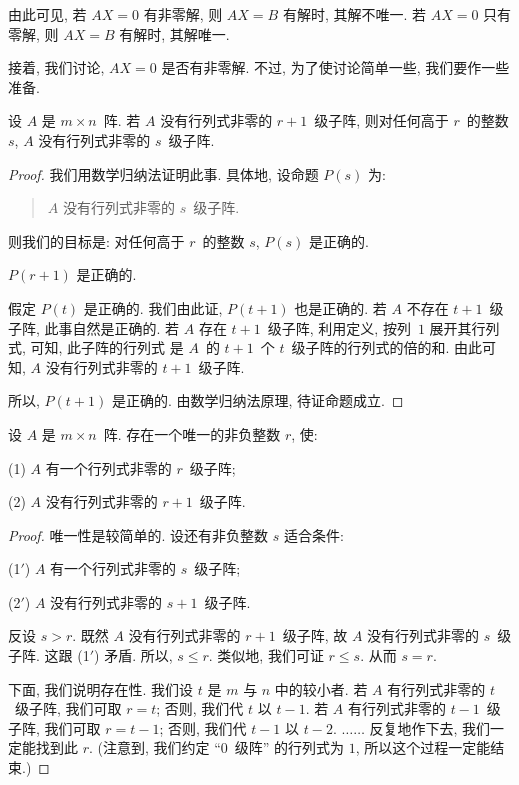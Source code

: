 由此可见, 若 \(AX = 0\) 有非零解,
则 \(AX = B\) 有解时,
其解不唯一.
若 \(AX = 0\) 只有零解,
则 \(AX = B\) 有解时,
其解唯一.

接着, 我们讨论, \(AX = 0\) 是否有非零解.
不过, 为了使讨论简单一些, 我们要作一些准备.

\begin{theorem}
    设 \(A\) 是 \(m \times n\)~阵.
    若 \(A\) 没有行列式非零的 \(r+1\)~级子阵,
    则对任何高于 \(r\)~的整数 \(s\),
    \(A\) 没有行列式非零的 \(s\)~级子阵.
\end{theorem}

\begin{proof}
    我们用数学归纳法证明此事.
    具体地, 设命题 \(P(s)\) 为:
    \begin{quotation}
        \(A\) 没有行列式非零的 \(s\)~级子阵.
    \end{quotation}
    则我们的目标是:
    对任何高于 \(r\)~的整数 \(s\),
    \(P(s)\) 是正确的.

    \(P(r+1)\) 是正确的.

    假定 \(P(t)\) 是正确的.
    我们由此证, \(P(t+1)\) 也是正确的.
    若 \(A\) 不存在 \(t+1\)~级子阵,
    此事自然是正确的.
    若 \(A\) 存在 \(t+1\)~级子阵,
    利用定义, 按列~\(1\) 展开其行列式,
    可知,
    此子阵的行列式%
    是 \(A\)~的 \(t+1\)~个 \(t\)~级子阵的行列式的倍的和.
    由此可知,
    \(A\) 没有行列式非零的 \(t+1\)~级子阵.

    所以, \(P(t+1)\) 是正确的.
    由数学归纳法原理, 待证命题成立.
\end{proof}

\begin{theorem}
    设 \(A\) 是 \(m \times n\)~阵.
    存在一个唯一的非负整数 \(r\),
    使:

    (1)
    \(A\) 有一个行列式非零的 \(r\)~级子阵;

    (2)
    \(A\) 没有行列式非零的 \(r+1\)~级子阵.
\end{theorem}

\begin{proof}
    唯一性是较简单的.
    设还有非负整数 \(s\) 适合条件:

    (1\ensuremath{'})
    \(A\) 有一个行列式非零的 \(s\)~级子阵;

    (2\ensuremath{'})
    \(A\) 没有行列式非零的 \(s+1\)~级子阵.

    反设 \(s > r\).
    既然 \(A\) 没有行列式非零的 \(r+1\)~级子阵,
    故 \(A\) 没有行列式非零的 \(s\)~级子阵.
    这跟 (1\ensuremath{'}) 矛盾.
    所以, \(s \leq r\).
    类似地, 我们可证 \(r \leq s\).
    从而 \(s = r\).

    下面, 我们说明存在性.
    我们设 \(t\) 是 \(m\) 与 \(n\) 中的较小者.
    若 \(A\) 有行列式非零的 \(t\)~级子阵,
    我们可取 \(r = t\);
    否则, 我们代 \(t\) 以 \(t - 1\).
    若 \(A\) 有行列式非零的 \(t - 1\)~级子阵,
    我们可取 \(r = t - 1\);
    否则, 我们代 \(t - 1\) 以 \(t - 2\).
    \(\dots \dots\)
    反复地作下去,
    我们一定能找到此 \(r\).
    (注意到, 我们约定 ``\(0\)~级阵'' 的行列式为 \(1\),
    所以这个过程一定能结束.)
\end{proof}

